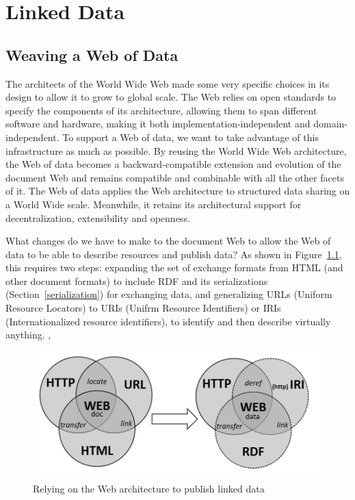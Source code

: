 \chapter{Linked Data}
\label{ch5}

\section{Weaving a Web of Data}



The architects  of the World Wide Web made some very specific choices in its design 
to allow it to grow to global scale.   The  Web relies on open standards to specify the components of its
architecture, allowing them to span different software and hardware, making it both implementation-independent and domain-independent. To
support a Web of data, we want to take advantage of this infrastructure as much as possible. 
By
reusing  the World Wide Web architecture, the Web of data
becomes a backward-compatible extension and evolution of the document
Web and remains compatible and combinable with all the other facets of
it. The Web of data applies the Web architecture to structured data
sharing on a World Wide scale. Meanwhile, it retains its architectural
support for decentralization, extensibility and openness.


What changes do we have to make to the document Web to allow the Web of data
to be able to describe  resources and publish data? As
shown in Figure~\ref{fig:ch5.1}, this requires two steps:  expanding the set of exchange formats from     HTML (and other document formats) to include  RDF and its serializations (Section~\ref{serialization}) for exchanging data, and generalizing 
URLs (Uniform Resource Locators) to URIs (Unifrm Resource Identifiers) 
or IRIs (Internationalized resource identifiers), to identify and then describe virtually anything. ,

\begin{figure}
    \centering
    \includegraphics[width=5.0in]{media/figure-05-01.jpg}
    \caption{Relying on the Web architecture to publish linked data}
    \label{fig:ch5.1}
\end{figure}


